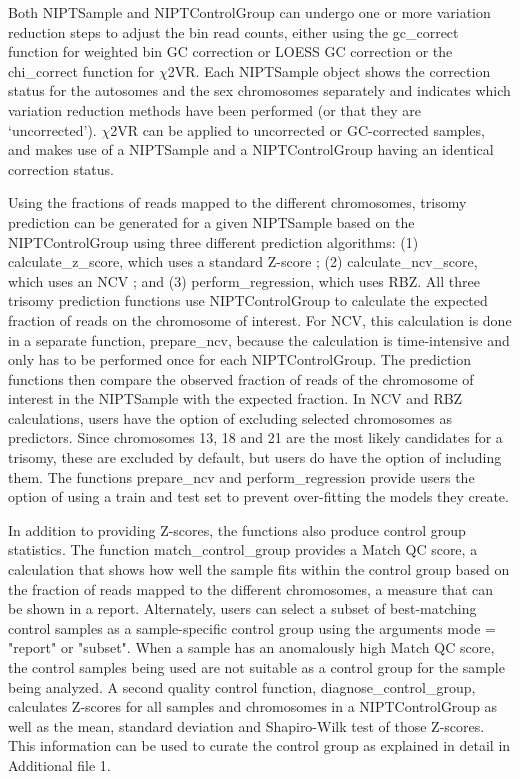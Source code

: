 Both NIPTSample and NIPTControlGroup can undergo one or more variation reduction steps to adjust the bin read counts, either using the gc\_correct function for weighted bin GC correction \cite{Fan_2010} or LOESS GC correction \cite{Chen_2011} or the chi\_correct function for $\chi$2VR. 
Each NIPTSample object shows the correction status for the autosomes and the sex chromosomes separately and indicates which variation reduction methods have been performed (or that they are ‘uncorrected’). 
$\chi$2VR can be applied to uncorrected or GC-corrected samples, and makes use of a NIPTSample and a NIPTControlGroup having an identical correction status.

Using the fractions of reads mapped to the different chromosomes, trisomy prediction can be generated for a given NIPTSample based on the NIPTControlGroup using three different prediction algorithms: (1) calculate\_z\_score, which uses a standard Z-score \cite{Chiu_2008}; (2) calculate\_ncv\_score, which uses an NCV \cite{Sehnert_2011}; and (3) perform\_regression, which uses RBZ. 
All three trisomy prediction functions use NIPTControlGroup to calculate the expected fraction of reads on the chromosome of interest. 
For NCV, this calculation is done in a separate function, prepare\_ncv, because the calculation is time-intensive and only has to be performed once for each NIPTControlGroup. 
The prediction functions then compare the observed fraction of reads of the chromosome of interest in the NIPTSample with the expected fraction. 
In NCV and RBZ calculations, users have the option of excluding selected chromosomes as predictors. Since chromosomes 13, 18 and 21 are the most likely candidates for a trisomy, these are excluded by default, but users do have the option of including them. 
The functions prepare\_ncv and perform\_regression provide users the option of using a train and test set to prevent over-fitting the models they create.

In addition to providing Z-scores, the functions also produce control group statistics. 
The function match\_control\_group provides a Match QC score, a calculation that shows how well the sample fits within the control group based on the fraction of reads mapped to the different chromosomes, a measure that can be shown in a report. 
Alternately, users can select a subset of best-matching control samples as a sample-specific control group using the arguments mode = "report" or "subset". 
When a sample has an anomalously high Match QC score, the control samples being used are not suitable as a control group for the sample being analyzed. 
A second quality control function, diagnose\_control\_group, calculates Z-scores for all samples and chromosomes in a NIPTControlGroup as well as the mean, standard deviation and Shapiro-Wilk test of those Z-scores. 
This information can be used to curate the control group as explained in detail in Additional file 1.

